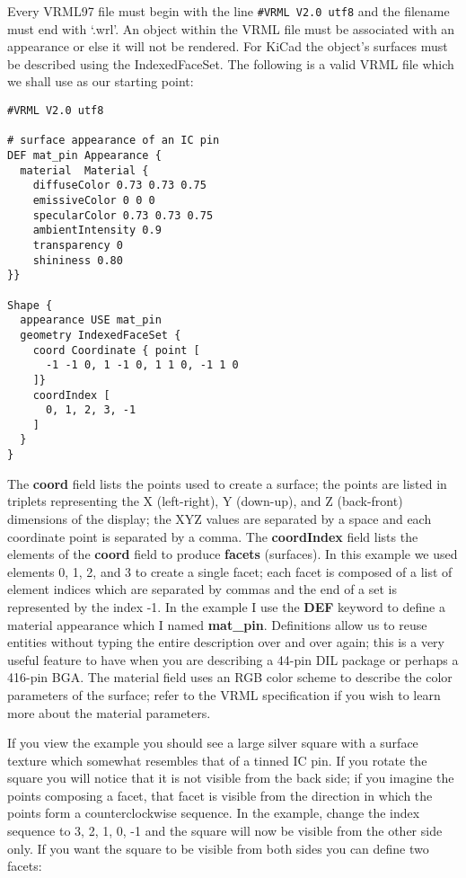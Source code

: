 \documentclass[a4paper]{article}
\begin{document}
Every VRML97 file must begin with the line \verb~#VRML V2.0 utf8~ and the filename must end with `.wrl'. An object within the VRML file must
be associated with an appearance or else it will not be rendered. For KiCad the object's surfaces must be described using the IndexedFaceSet.
The following is a valid VRML file which we shall use as our starting point:

\begin{verbatim}
#VRML V2.0 utf8

# surface appearance of an IC pin
DEF mat_pin Appearance {
  material  Material {
    diffuseColor 0.73 0.73 0.75
    emissiveColor 0 0 0
    specularColor 0.73 0.73 0.75
    ambientIntensity 0.9
    transparency 0
    shininess 0.80
}}

Shape {
  appearance USE mat_pin
  geometry IndexedFaceSet {
    coord Coordinate { point [
      -1 -1 0, 1 -1 0, 1 1 0, -1 1 0
    ]}
    coordIndex [
      0, 1, 2, 3, -1
    ]
  }
}
\end{verbatim}

The \textbf{coord} field lists the points used to create a surface; the points are listed in triplets representing the X (left-right),
Y (down-up), and Z (back-front) dimensions of the display; the XYZ values are separated by a space and each coordinate point is
separated by a comma. The \textbf{coordIndex} field lists the elements of the \textbf{coord} field to produce \textbf{facets} (surfaces).
In this example we used elements 0, 1, 2, and 3 to create a single facet; each facet is composed of a list of element indices
which are separated by commas and the end of a set is represented by the index -1. In the example I use the \textbf{DEF} keyword
to define a material appearance which I named \textbf{mat\_pin}. Definitions allow us to reuse entities without typing the entire
description over and over again; this is a very useful feature to have when you are describing a 44-pin DIL package or perhaps a
416-pin BGA.  The material field uses an RGB color scheme to describe the color parameters of the surface; refer to the VRML
specification if you wish to learn more about the material parameters.

If you view the example you should see a large silver square with a surface texture which somewhat resembles that of a tinned IC pin.
If you rotate the square you will notice that it is not visible from the back side; if you imagine the points composing a facet, that facet
is visible from the direction in which the points form a counterclockwise sequence. In the example, change the index sequence to 3, 2, 1, 0, -1
and the square will now be visible from the other side only. If you want the square to be visible from both sides you can define two facets:
\end{document}
